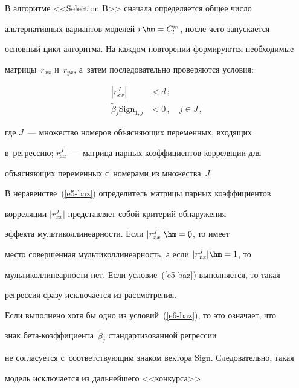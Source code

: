   В алгоритме <<Selection B>> сначала определяется общее число 


альтернативных вариантов моделей $r\hm=C_l^m$, после чего запускается 


основный цикл алгоритма. На каждом повторении формируются необходимые 


матрицы~$r_{xx}$ и~$r_{yx}$, а~затем последовательно проверяются условия:


  \begin{align}


  \left\vert r_{xx}^J\right\vert &<d\,; \label{e5-baz}\\


  \tilde{\beta}_j \mathrm{Sign}_{1,j} &<0\,,\quad j\in J\,,


  \label{e6-baz}


  \end{align}


где $J$~--- множество номеров объясняющих переменных, входящих 


в~регрессию; $r_{xx}^J$~--- матрица парных коэффициентов корреляции для 


объясняющих переменных с~номерами из множества~$J$.


  


  В неравенстве~(\ref{e5-baz}) определитель матрицы парных коэффициентов 


корреляции $\vert r_{xx}^J\vert$ представляет собой критерий обнаружения 


эффекта мультиколлинеарности. Если $\vert r_{xx}^J\vert \hm=0$, то имеет 


место совершенная мультиколлинеарность, а если $\vert r_{xx}^J\vert\hm=1$, то 


мультиколлинеарности нет. Если условие~(\ref{e5-baz}) выполняется, то такая 


регрессия сразу исключается из рассмотрения.


  


  Если выполнено хотя бы одно из условий~(\ref{e6-baz}), то это означает, что 


знак бе\-та-ко\-эф\-фи\-ци\-ен\-та~$\tilde{\beta}_j$ стандартизованной регрессии 


не согласуется с~соответствующим знаком вектора Sign. Следовательно, такая 


модель исключается из дальнейшего <<конкурса>>.


  


